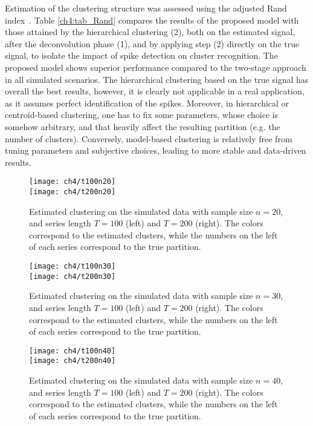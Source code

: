 Estimation of the clustering structure was assessed using the adjusted Rand index~\parencite{rand1971,hubert1985}. Table \ref{ch4:tab_Rand} compares the results of the proposed model with those attained by the hierarchical clustering (2), both on the estimated signal, after the deconvolution phase (1), and by applying step (2) directly on the true signal, to isolate the impact of spike detection on cluster recognition. The proposed model shows superior performance compared to the two-stage approach in all simulated scenarios. The hierarchical clustering based on the true signal has overall the best results, however, it is clearly not applicable in a real application, as it assumes perfect identification of the spikes.
Moreover, in hierarchical or centroid-based clustering, one has to fix some parameters, whose choice is somehow arbitrary, and that heavily affect the resulting partition (e.g. the number of clusters). Conversely, model-based clustering is relatively free from tuning parameters and subjective choices, leading to more stable and data-driven results.







\begin{figure}
	\centering
	\texttt{[image: ch4/t100n20]}\\
	\texttt{[image: ch4/t200n20]}
	\label{ch4:fig_n20}
	\caption[Estimated clustering on the simulated data with sample size $n=20$.]{Estimated clustering on the simulated data with sample size $n=20$, and series length $T=100$ (left) and $T=200$ (right). The colors correspond to the estimated clusters, while the numbers on the left of each series correspond to the true partition.}
\end{figure}

\begin{figure}
	\centering
	\texttt{[image: ch4/t100n30]}\\
	\texttt{[image: ch4/t200n30]}
	\label{ch4:fig_n30}
	\caption[Estimated clustering on the simulated data with sample size $n=30$.]{Estimated clustering on the simulated data with sample size $n=30$, and series length $T=100$ (left) and $T=200$ (right). The colors correspond to the estimated clusters, while the numbers on the left of each series correspond to the true partition.}
\end{figure}

\begin{figure}
	\centering
	\texttt{[image: ch4/t100n40]}\\
	\texttt{[image: ch4/t200n40]}
	\label{ch4:fig_n40}
	\caption[Estimated clustering on the simulated data with sample size $n=40$.]{Estimated clustering on the simulated data with sample size $n=40$, and series length $T=100$ (left) and $T=200$ (right). The colors correspond to the estimated clusters, while the numbers on the left of each series correspond to the true partition.}
\end{figure}









